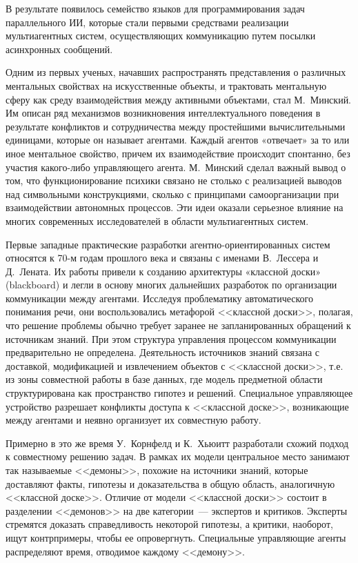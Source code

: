 В результате появилось семейство языков для программирования задач параллельного ИИ, которые стали первыми средствами реализации мультиагентных систем, осуществляющих коммуникацию путем посылки асинхронных сообщений.

Одним из первых ученых, начавших распространять представления о различных ментальных свойствах на искусственные объекты, и трактовать ментальную сферу как среду взаимодействия между активными объектами, стал М.~Минский. Им описан ряд механизмов возникновения интеллектуального поведения в результате конфликтов и сотрудничества между простейшими вычислительными единицами, которые он называет агентами. Каждый агентов «отвечает» за то или иное ментальное свойство, причем их взаимодействие происходит спонтанно, без участия какого-либо управляющего агента. М.~Минский сделал важный вывод о том, что функционирование психики связано не столько с реализацией выводов над символьными конструкциями, сколько с принципами самоорганизации при взаимодействии автономных процессов. Эти идеи оказали серьезное влияние на многих современных исследователей в области мультиагентных систем.

Первые западные практические разработки агентно-ориентированных систем  относятся к 70-м годам прошлого века и связаны с именами В.~Лессера и Д.~Лената. Их работы привели к созданию архитектуры «классной доски» (blackboard) и легли в основу многих дальнейших разработок по организации коммуникации между агентами. Исследуя проблематику автоматического понимания речи, они воспользовались метафорой <<классной доски>>, полагая, что решение проблемы обычно требует заранее не запланированных обращений к источникам знаний. При этом структура управления процессом коммуникации предварительно не определена. Деятельность источников знаний связана с доставкой, модификацией и извлечением объектов с <<классной доски>>, т.е. из зоны совместной работы в базе данных, где модель предметной области структурирована как пространство гипотез и решений. Специальное управляющее устройство разрешает конфликты доступа к <<классной доске>>, возникающие между агентами и неявно организует их совместную работу.

Примерно в это же время У.~Корнфелд и К.~Хьюитт разработали схожий подход к совместному решению задач. В рамках их модели центральное место занимают так называемые <<демоны>>, похожие на источники знаний, которые доставляют факты, гипотезы и доказательства в общую область, аналогичную <<классной доске>>. Отличие от модели <<классной доски>> состоит в разделении <<демонов>> на две категории~--- экспертов и критиков. Эксперты стремятся доказать справедливость некоторой гипотезы, а критики, наоборот, ищут контрпримеры, чтобы ее опровергнуть. Специальные управляющие агенты распределяют время, отводимое каждому <<демону>>.


